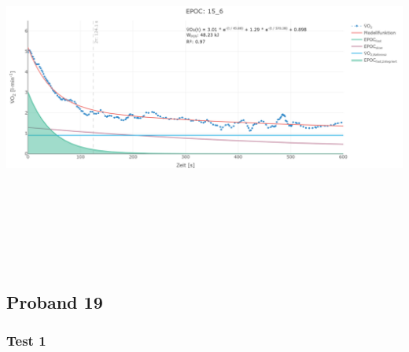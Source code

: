 \documentclass[
  letterpaper,
  DIV=11]{scrartcl}
\begin{document}
\includegraphics[width=11.45833in,height=4.6875in]{images/15_6.png}

\subsection{Proband 19}

\subsubsection{Test 1}
\end{document}
